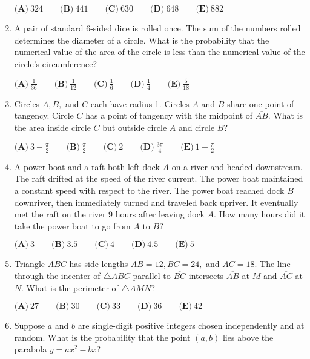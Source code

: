 \documentclass{article}
\begin{document}
\begin{enumerate}[label=\arabic*., itemsep=0.5em]
\(
\textbf{(A)}\ 324 \qquad
\textbf{(B)}\ 441 \qquad
\textbf{(C)}\ 630 \qquad
\textbf{(D)}\ 648 \qquad
\textbf{(E)}\ 882 \)\par \vspace{0.5em}\item A pair of standard \(6\)-sided dice is rolled once. The sum of the numbers rolled determines the diameter of a circle. What is the probability that the numerical value of the area of the circle is less than the numerical value of the circle's circumference?

\(
\textbf{(A)}\ \frac{1}{36} \qquad
\textbf{(B)}\ \frac{1}{12} \qquad
\textbf{(C)}\ \frac{1}{6} \qquad
\textbf{(D)}\ \frac{1}{4} \qquad
\textbf{(E)}\ \frac{5}{18} \)\par \vspace{0.5em}\item Circles \(A, B,\) and \(C\) each have radius 1. Circles \(A\) and \(B\) share one point of tangency. Circle \(C\) has a point of tangency with the midpoint of \(\overline{AB}.\) What is the area inside circle \(C\) but outside circle \(A\) and circle \(B?\)

\(
\textbf{(A)}\ 3 - \frac{\pi}{2} \qquad
\textbf{(B)}\ \frac{\pi}{2} \qquad
\textbf{(C)}\  2 \qquad
\textbf{(D)}\ \frac{3\pi}{4} \qquad
\textbf{(E)}\ 1+\frac{\pi}{2} \)\par \vspace{0.5em}\item A power boat and a raft both left dock \(A\) on a river and headed downstream. The raft drifted at the speed of the river current. The power boat maintained a constant speed with respect to the river. The power boat reached dock \(B\) downriver, then immediately turned and traveled back upriver. It eventually met the raft on the river 9 hours after leaving dock \(A.\) How many hours did it take the power boat to go from \(A\) to \(B?\)

\(
\textbf{(A)}\ 3 \qquad
\textbf{(B)}\ 3.5 \qquad
\textbf{(C)}\  4 \qquad
\textbf{(D)}\ 4.5 \qquad
\textbf{(E)}\ 5 \)\par \vspace{0.5em}\item Triangle \(ABC\) has side-lengths \(AB = 12, BC = 24,\) and \(AC = 18.\) The line through the incenter of \(\triangle ABC\) parallel to \(\overline{BC}\) intersects \(\overline{AB}\) at \(M\) and \(\overline{AC}\) at \(N.\) What is the perimeter of \(\triangle AMN?\)

\(
\textbf{(A)}\ 27 \qquad
\textbf{(B)}\ 30 \qquad
\textbf{(C)}\  33 \qquad
\textbf{(D)}\ 36 \qquad
\textbf{(E)}\ 42 \)\par \vspace{0.5em}\item Suppose \(a\) and \(b\) are single-digit positive integers chosen independently and at random. What is the probability that the point \((a,b)\) lies above the parabola \(y=ax^2-bx\)?


\end{enumerate}
\end{document}
